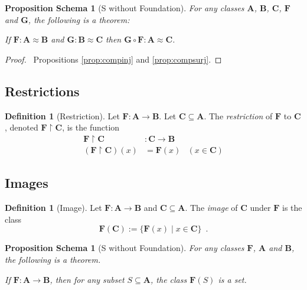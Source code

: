 \documentclass{book}
\let\qed\relax
\newtheorem{props}[ax]{Proposition Schema}
\theoremstyle{definition}
\newtheorem{df}[ax]{Definition}
\begin{document}
\begin{props}[S without Foundation]
\label{prop:compbij}
For any classes $\mathbf{A}$, $\mathbf{B}$, $\mathbf{C}$, $\mathbf{F}$ and $\mathbf{G}$, the following is a theorem:

If $\mathbf{F} : \mathbf{A} \approx \mathbf{B}$ and $\mathbf{G} : \mathbf{B} \approx \mathbf{C}$ then $\mathbf{G} \circ \mathbf{F} : \mathbf{A} \approx \mathbf{C}$.
\end{props}

\begin{proof}
\pf\ Propositions \ref{prop:compinj} and \ref{prop:compsurj}. \qed
\end{proof}

\subsection{Restrictions}

\begin{df}[Restriction]
Let $\mathbf{F} : \mathbf{A} \rightarrow \mathbf{B}$. Let $\mathbf{C} \subseteq \mathbf{A}$. The \emph{restriction} of $\mathbf{F}$ to $\mathbf{C}$, denoted $\mathbf{F} \restriction \mathbf{C}$, is the function
\begin{align*}
\mathbf{F} \restriction \mathbf{C} & : \mathbf{C} \rightarrow \mathbf{B} \\
(\mathbf{F} \restriction \mathbf{C})(x) & = \mathbf{F}(x) & (x \in \mathbf{C})
\end{align*}
\end{df}

\subsection{Images}

\begin{df}[Image]
Let $\mathbf{F} : \mathbf{A} \rightarrow \mathbf{B}$ and $\mathbf{C} \subseteq \mathbf{A}$. The \emph{image} of $\mathbf{C}$ under $\mathbf{F}$ is the class
\[ \mathbf{F}(\mathbf{C}) := \{ \mathbf{F}(x) \mid x \in \mathbf{C} \} \enspace . \]
\end{df}

\begin{props}[S without Foundation]
For any classes $\mathbf{F}$, $\mathbf{A}$ and $\mathbf{B}$, the following is a theorem.

If $\mathbf{F} : \mathbf{A} \rightarrow \mathbf{B}$, then for any subset $S \subseteq \mathbf{A}$, the class $\mathbf{F}(S)$ is a set.
\end{props}
\end{document}
